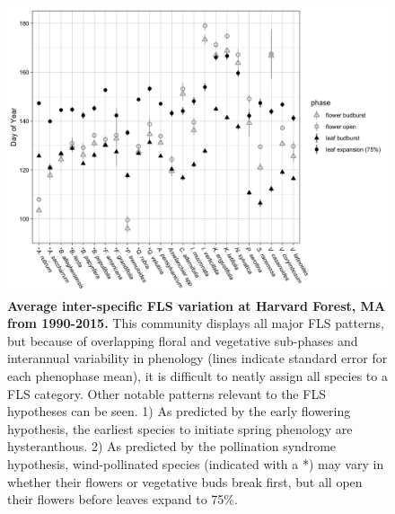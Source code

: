 \documentclass[12pt]{article}
\begin{document}
\begin{figure}[ht]
    \centering
    \includegraphics[width=\textwidth]{..//figure/HFmeans_expanded.png}
    \caption{\textbf{Average inter-specific FLS variation at Harvard Forest, MA from 1990-2015.} This community displays all major FLS patterns, but because of overlapping floral and vegetative sub-phases and interannual variability in phenology (lines indicate standard error for each phenophase mean), it is difficult to neatly assign all species to a FLS category. Other notable patterns relevant to the FLS hypotheses can be seen. 1) As predicted by the early flowering hypothesis, the earliest species to initiate spring phenology are hysteranthous. 2) As predicted by the pollination syndrome hypothesis, wind-pollinated species (indicated with a *) may vary in whether their flowers or vegetative buds break first, but all open their flowers before leaves expand to 75\%.}
    \label{fig:Figure 2}
\end{figure}
\end{document}
